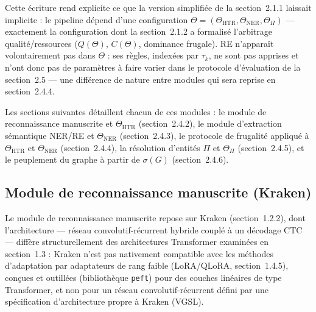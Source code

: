 Cette écriture rend explicite ce que la version simplifiée de la section~2.1.1 laissait implicite : le pipeline dépend d'une configuration $\Theta = (\Theta_{\mathrm{HTR}}, \Theta_{\mathrm{NER}}, \Theta_\Pi)$ --- exactement la configuration dont la section~2.1.2 a formalisé l'arbitrage qualité/ressources ($Q(\Theta)$, $C(\Theta)$, dominance frugale).
RE n'apparaît volontairement pas dans $\Theta$ : ses règles, indexées par $\tau_k$, ne sont pas apprises et n'ont donc pas de paramètres à faire varier dans le protocole d'évaluation de la section~2.5 --- une différence de nature entre modules qui sera reprise en section~2.4.4.

Les sections suivantes détaillent chacun de ces modules : le module de reconnaissance manuscrite et $\Theta_{\mathrm{HTR}}$ (section~2.4.2), le module d'extraction sémantique NER/RE et $\Theta_{\mathrm{NER}}$ (section~2.4.3), le protocole de frugalité appliqué à $\Theta_{\mathrm{HTR}}$ et $\Theta_{\mathrm{NER}}$ (section~2.4.4), la résolution d'entités $\Pi$ et $\Theta_\Pi$ (section~2.4.5), et le peuplement du graphe à partir de $\sigma(G)$ (section~2.4.6).

\subsection{Module de reconnaissance manuscrite (Kraken)}

Le module de reconnaissance manuscrite repose sur Kraken (section~1.2.2), dont l'architecture --- réseau convolutif-récurrent hybride couplé à un décodage CTC --- diffère structurellement des architectures Transformer examinées en section~1.3 : Kraken n'est pas nativement compatible avec les méthodes d'adaptation par adaptateurs de rang faible (LoRA/QLoRA, section~1.4.5), conçues et outillées (bibliothèque \texttt{peft}) pour des couches linéaires de type Transformer, et non pour un réseau convolutif-récurrent défini par une spécification d'architecture propre à Kraken (VGSL).

